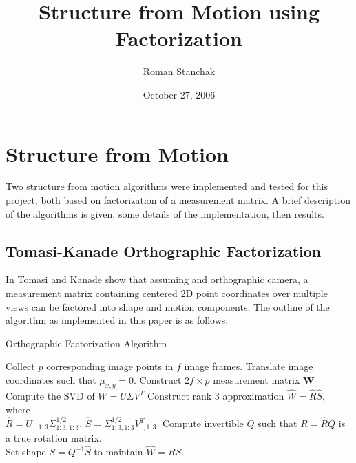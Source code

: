 \documentclass{article}
\title{ Structure from Motion using Factorization }
\author{ Roman Stanchak }
\date{ October 27, 2006 }
\begin{document}
\maketitle
\section{Structure from Motion}
Two structure from motion algorithms were implemented and tested for this project, both based 
on factorization of a measurement matrix.  A brief description of the algorithms is given, 
some details of the implementation, then results.
\subsection{Tomasi-Kanade Orthographic Factorization}
In \cite{tomasi1992} Tomasi and Kanade show that assuming and orthographic camera, a measurement matrix containing centered 2D point coordinates over multiple views can be factored into shape 
and motion components.  The outline of the algorithm as implemented in this paper is as follows:
\begin{algorithm}[htb]
    \caption{Orthographic Factorization Algorithm}
    \label{alg:ofact}
    \begin{algorithmic}[1]
		\STATE Collect $p$ corresponding image points in $f$ image frames.
        \STATE Translate image coordinates such that $\mu_{x,y}=0$.
		\STATE Construct $2f \times p$ measurement matrix $\mathbf{W}$
		\STATE Compute the SVD of $W=U\Sigma V^T$
		\STATE Construct rank 3 approximation $\hat{W}=\hat{R}\hat{S}$, where \\ 
		$\hat{R}=U_{:,1:3}\Sigma_{1:3,1:3}^{1/2}$, $\hat{S}=\Sigma_{1:3,1:3}^{1/2}V_{:,1:3}^T$.
		\STATE Compute invertible $Q$ such that $R=\hat{R}Q$ is a true rotation matrix. \\
		Set shape $S=Q^{-1}\hat{S}$ to maintain $\hat{W} = RS$.
	\end{algorithmic}
\end{algorithm}
 
\end{document}

